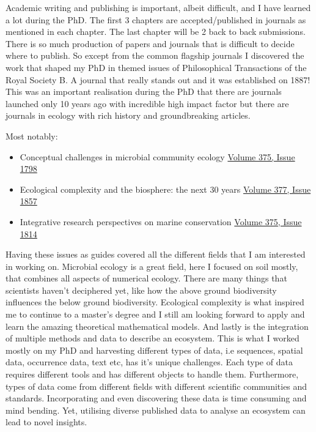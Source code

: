 \documentclass[
11pt, %
english, %
singlespacing, %
toctotoc, %
headsepline, %
]{MastersDoctoralThesis} %
\begin{document}
Academic writing and publishing is important, albeit difficult, and I have learned a
lot during the PhD. The first 3 chapters are accepted/published in journals as
mentioned in each chapter. The last chapter will be 2 back to back submissions.
There is so much production of papers and journals that is difficult to decide where to publish. 
So except from the common flagship journals I discovered the work that shaped my 
PhD in themed issues of Philosophical Transactions of the Royal Society B.
A journal that really stands out and it was established on 1887! This was an
important realisation during the PhD that there are journals launched only 10 years
ago with incredible high impact factor but there are journals in ecology
with rich history and groundbreaking articles.

Most notably:

\begin{itemize}
    \item Conceptual challenges in microbial community ecology \href{https://doi.org/10.1098/rstb.2019.0241}{Volume 375, Issue 1798}
    \item Ecological complexity and the biosphere: the next 30 years \href{https://doi.org/10.1098/rstb.2021.0376}{Volume 377, Issue 1857}
    \item Integrative research perspectives on marine conservation \href{https://doi.org/10.1098/rstb.2019.0444}{Volume 375, Issue 1814}
\end{itemize}

Having these issues as guides covered all the different fields that I am interested 
in working on. Microbial ecology is a great field, here I focused on soil mostly, that
combines all aspects of numerical ecology. There are many things that scientists 
haven't deciphered yet, like how the above ground biodiversity influences the below
ground biodiversity. Ecological complexity is what inspired me to continue to a 
master's degree and I still am looking forward to apply and learn the amazing 
theoretical mathematical models. And lastly is the integration of multiple methods 
and data to describe an ecosystem. This is what I worked mostly on my PhD and 
harvesting different types of data, i.e sequences, spatial data, occurrence data, 
text etc, has it's unique challenges. Each type of data requires different tools and has 
different objects to handle them. Furthermore, types of data come from different 
fields with different scientific communities and standards. Incorporating and even 
discovering these data is time consuming and mind bending. Yet, utilising diverse 
published data to analyse an ecosystem can lead to novel insights. 
\end{document}
